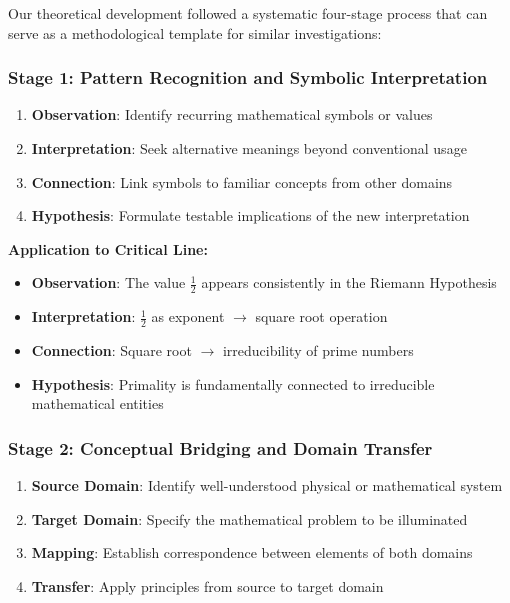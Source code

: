 Our theoretical development followed a systematic four-stage process that can serve as a methodological template for similar investigations:

\subsubsection{Stage 1: Pattern Recognition and Symbolic Interpretation}

\begin{process}
\begin{enumerate}
\item \textbf{Observation}: Identify recurring mathematical symbols or values
\item \textbf{Interpretation}: Seek alternative meanings beyond conventional usage
\item \textbf{Connection}: Link symbols to familiar concepts from other domains
\item \textbf{Hypothesis}: Formulate testable implications of the new interpretation
\end{enumerate}
\end{process}

\textbf{Application to Critical Line:}
\begin{itemize}
\item \textbf{Observation}: The value $\frac{1}{2}$ appears consistently in the Riemann Hypothesis
\item \textbf{Interpretation}: $\frac{1}{2}$ as exponent $\rightarrow$ square root operation
\item \textbf{Connection}: Square root $\rightarrow$ irreducibility of prime numbers
\item \textbf{Hypothesis}: Primality is fundamentally connected to irreducible mathematical entities
\end{itemize}

\subsubsection{Stage 2: Conceptual Bridging and Domain Transfer}

\begin{process}
\begin{enumerate}
\item \textbf{Source Domain}: Identify well-understood physical or mathematical system
\item \textbf{Target Domain}: Specify the mathematical problem to be illuminated
\item \textbf{Mapping}: Establish correspondence between elements of both domains
\item \textbf{Transfer}: Apply principles from source to target domain
\end{enumerate}
\end{process}

